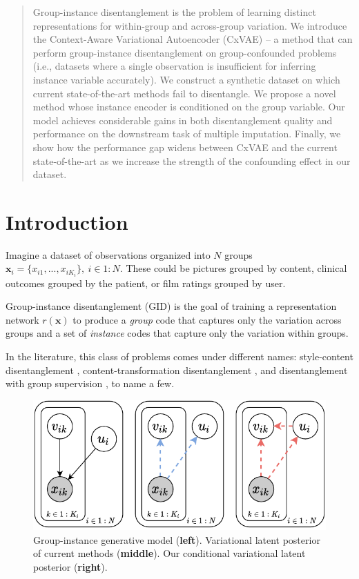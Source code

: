 \documentclass[nohyperref]{article}
\theoremstyle{plain}
\theoremstyle{definition}
\theoremstyle{remark}
\begin{document}
\begin{abstract}
Group-instance disentanglement is the problem of learning distinct representations for within-group and across-group variation. We introduce the Context-Aware Variational Autoencoder (CxVAE) -- a method that can perform group-instance disentanglement on group-confounded problems (i.e., datasets where a single observation is insufficient for inferring instance variable accurately). We construct a synthetic dataset on which current state-of-the-art methods fail to disentangle. We propose a novel method whose instance encoder is conditioned on the group variable. Our model achieves considerable gains in both disentanglement quality and performance on the downstream task of multiple imputation. Finally, we show how the performance gap widens between CxVAE and the current state-of-the-art as we increase the strength of the confounding effect in our dataset.
\end{abstract}

\section{Introduction}
\label{intro}

Imagine a dataset of observations organized into $N$ groups $\mathbf{x}_i = \{x_{i1}, ..., x_{iK_i}\}, ~ i \in 1:N$. These could be pictures grouped by content,  clinical outcomes grouped by the patient, or film ratings grouped by user.

Group-instance disentanglement (GID) is the goal of training a representation network $r(\mathbf{x})$ to produce a \textit{group} code that captures only the variation across groups and a set of \textit{instance} codes that capture only the variation within groups. 

In the literature, this class of problems comes under different names: style-content disentanglement \citep{Tenenbaum2000SeparatingSA}, content-transformation disentanglement \citep{Hosoya2019GroupbasedLO},  and disentanglement with group supervision \citep{Shu2020Weakly}, to name a few.

\begin{figure}[th]
    \vskip 0.2in
    \begin{center}
    \centerline{\includegraphics[width=\columnwidth]{files/pgm.pdf}}
    \caption{Group-instance generative model (\textbf{left}). Variational latent posterior of current methods (\textbf{middle}). Our conditional variational latent posterior (\textbf{right}).}
    \label{fig:pgm}
    \end{center}
    \vskip -0.2in
\end{figure}
\end{document}
